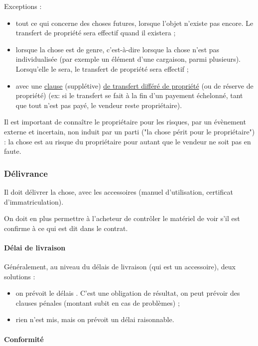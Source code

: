 		
			Exceptions :
		
			\begin{itemize}
				\item tout ce qui concerne des choses futures, lorsque l'objet n'existe pas encore. Le transfert de propriété sera effectif quand il existera ;
				\item lorsque la chose est de genre, c'est-à-dire lorsque la chose n'est pas individualisée (par exemple un élément d'une cargaison, parmi plusieurs). Lorsqu'elle le sera, le transfert de propriété sera effectif ;
				\item avec une \underline{clause} (supplétive) \underline{de transfert différé de propriété} (ou de réserve de propriété) (ex: si le transfert se fait à la fin d'un payement échelonné, tant que tout n'est pas payé, le vendeur reste propriétaire).
			\end{itemize}		
		
			Il est important de connaître le propriétaire pour les risques, par un évènement externe et incertain, non induit par un parti ("la chose périt pour le propriétaire") : la chose est au risque du propriétaire pour autant que le vendeur ne soit pas en faute.
		
			\subsubsection{Délivrance}
			
			Il doit délivrer la chose, avec les accessoires (manuel d'utilisation, certificat d'immatriculation). 
			
			On doit en plus permettre à l'acheteur de contrôler le matériel de voir s'il est confirme à ce qui est dit dans le contrat.
			\pagebreak
				\paragraph{Délai de livraison}		
				Généralement, au niveau du délais de livraison (qui est un accessoire), deux solutions :
		
				\begin{itemize}
					\item on prévoit le délais . C'est une obligation de résultat, on peut prévoir des clauses pénales (montant subit en cas de problèmes) ;
					\item rien n'est mis, mais on prévoit un délai raisonnable. 
				\end{itemize}
		
		
				\paragraph{Conformité}
				
